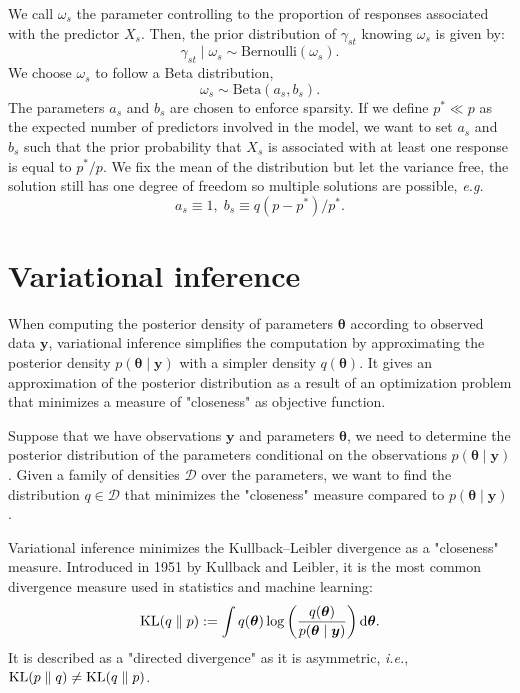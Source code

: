 \documentclass{article}
\numberwithin{equation}{section}
\DeclareMathOperator*{\KL}{{\rm KL}}
\begin{document}
We call $\omega_s$ the parameter controlling to the proportion of responses associated with the predictor $X_s$. Then, the prior distribution of $\gamma_{st}$ knowing $\omega_s$ is given by:
\begin{equation*}
\gamma_{st} \mid \omega_s \sim  \text{Bernoulli}(\omega_s).
\end{equation*}
We choose $\omega_s$ to follow a Beta distribution,
\begin{equation*}
\omega_s \sim \text{Beta}(a_s, b_s).
\end{equation*}
The parameters $a_s$ and $b_s$ are chosen to enforce sparsity. If we define $p^* \ll p$ as the expected number of predictors involved in the model, we want to set $a_s$ and $b_s$ such that the prior probability that $X_s$ is associated with at least one response is equal to $p^*/p$. We fix the mean of the distribution but let the variance free, the solution still has one degree of freedom so multiple solutions are possible, \textit{e.g.}
\begin{equation*}
a_s \equiv 1,\;b_s \equiv q(p-p^*)/p^*.
\end{equation*}
\newpage
\section{Variational inference}
When computing the posterior density of parameters $\boldsymbol{\theta}$ according to observed data $\boldsymbol{y}$, variational inference simplifies the computation by approximating the posterior density $p(\boldsymbol{\theta}\mid \boldsymbol{y})$ with a simpler density $q(\boldsymbol{\theta})$. It gives an approximation of the posterior distribution as a result of an optimization problem that minimizes a measure of "closeness" as objective function.

Suppose that we have observations $\boldsymbol{y}$ and parameters $\boldsymbol{\theta}$, we need to determine the posterior distribution of the parameters conditional on the observations $p(\boldsymbol{\theta} \mid \boldsymbol{y})$. Given a family of densities $\mathcal{D}$ over the parameters, we want to find the distribution $q \in \mathcal{D}$ that minimizes the "closeness" measure compared to $p(\boldsymbol{\theta} \mid \boldsymbol{y})$.

Variational inference minimizes the Kullback--Leibler divergence as a "closeness" measure. Introduced in 1951 by Kullback and Leibler\cite{kl51}, it is the most common divergence measure used in statistics and machine learning:
\begin{equation*}
\KL(q\parallel p) := \int q(\boldsymbol{\theta})\log \left(\frac{q(\boldsymbol{\theta})}{p(\boldsymbol{\theta} \mid \boldsymbol{y})}\right) \mathrm{d}\boldsymbol{\theta}.
\end{equation*} 
It is described as a "directed divergence" as it is asymmetric, \textit{i.e.}, $\KL(p\parallel q) \neq \KL(q \parallel p)$.
\end{document}

